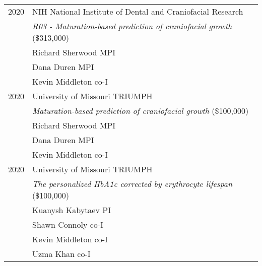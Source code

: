 \begin{longtable}{@{}lX@{}}
    2020 & NIH National Institute of Dental and Craniofacial Research\\
         & \emph{R03 - Maturation-based prediction of craniofacial growth} (\$313,000)\\
         & Richard Sherwood MPI\\
         & Dana Duren MPI\\
         & Kevin Middleton co-I\\[0.5pc]
    2020 & University of Missouri TRIUMPH\\
         & \emph{Maturation-based prediction of craniofacial growth} (\$100,000)\\
         & Richard Sherwood MPI\\
         & Dana Duren MPI\\
         & Kevin Middleton co-I\\[0.5pc]
    2020 & University of Missouri TRIUMPH\\
         & \emph{The personalized HbA1c corrected by erythrocyte lifespan} (\$100,000)\\
         & Kuanysh Kabytaev PI\\
         & Shawn Connoly co-I\\
         & Kevin Middleton co-I\\
         & Uzma Khan co-I\\[0.5pc]
\end{longtable}
